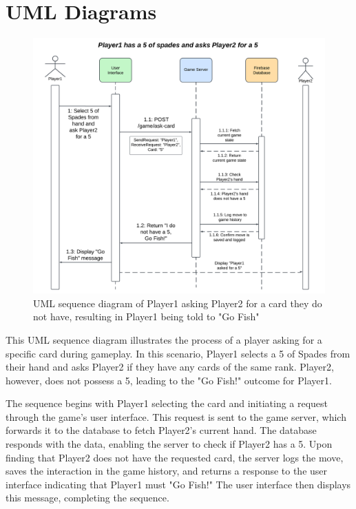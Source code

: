 \pagebreak
\section{UML Diagrams}
\begin{figure}[H]
    \centering
    \includegraphics[width=1\linewidth]{CS482 Sequence Diagram Sprint 2.png}
    \caption{UML sequence diagram of Player1 asking Player2 for a card they do not have, resulting in Player1 being told to "Go Fish"}
    \label{fig:umlsequence}
\end{figure}
\vspace{-1em}
\noindent This UML sequence diagram illustrates the process of a player asking for a specific card during gameplay. In this scenario, Player1 selects a 5 of Spades from their hand and asks Player2 if they have any cards of the same rank. Player2, however, does not possess a 5, leading to the "Go Fish!" outcome for Player1.

\noindent The sequence begins with Player1 selecting the card and initiating a request through the game's user interface. This request is sent to the game server, which forwards it to the database to fetch Player2's current hand. The database responds with the data, enabling the server to check if Player2 has a 5. Upon finding that Player2 does not have the requested card, the server logs the move, saves the interaction in the game history, and returns a response to the user interface indicating that Player1 must "Go Fish!" The user interface then displays this message, completing the sequence.

